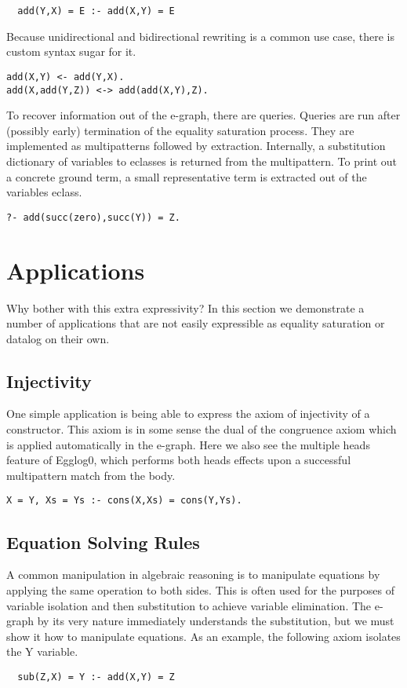 \documentclass[sigplan,10pt,review,anonymous]{acmart}
\begin{document}
\begin{lstlisting}
  add(Y,X) = E :- add(X,Y) = E
\end{lstlisting}

Because unidirectional and bidirectional rewriting is a common use case, there is custom syntax sugar for it.

\begin{lstlisting}
add(X,Y) <- add(Y,X).
add(X,add(Y,Z)) <-> add(add(X,Y),Z).
\end{lstlisting}

To recover information out of the e-graph, there are queries. Queries are run after (possibly early) termination of the equality saturation process. They are implemented as multipatterns followed by extraction. Internally, a substitution dictionary of variables to eclasses is returned from the multipattern. To print out a concrete ground term, a small representative term is extracted out of the variables eclass.

\begin{lstlisting}
?- add(succ(zero),succ(Y)) = Z.
\end{lstlisting}

\section{Applications}
Why bother with this extra expressivity? In this section we demonstrate a number of applications that are not easily expressible as equality saturation or datalog on their own.

\subsection{Injectivity}
One simple application is being able to express the axiom of injectivity of a constructor. This axiom is in some sense the dual of the congruence axiom which is applied automatically in the e-graph. Here we also see the multiple heads feature of Egglog0, which performs both heads effects upon a successful multipattern match from the body.

\begin{lstlisting}
X = Y, Xs = Ys :- cons(X,Xs) = cons(Y,Ys).
\end{lstlisting}

\subsection{Equation Solving Rules}
A common manipulation in algebraic reasoning is to manipulate equations by applying the same operation to both sides. This is often used for the purposes of variable isolation and then substitution to achieve variable elimination. The e-graph by its very nature immediately understands the substitution, but we must show it how to manipulate equations. As an example, the following axiom isolates the Y variable. 
\begin{lstlisting}
  sub(Z,X) = Y :- add(X,Y) = Z
\end{lstlisting}
\end{document}
